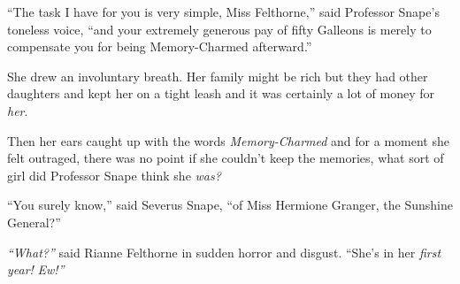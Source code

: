``The task I have for you is very simple, Miss Felthorne,'' said
Professor Snape's toneless voice, ``and your extremely generous pay of
fifty Galleons is merely to compensate you for being Memory-Charmed
afterward.''

She drew an involuntary breath. Her family might be rich but they had
other daughters and kept her on a tight leash and it was certainly a lot
of money for \emph{her}.

Then her ears caught up with the words \emph{Memory-Charmed} and for a
moment she felt outraged, there was no point if she couldn't keep the
memories, what sort of girl did Professor Snape think she \emph{was?}

``You surely know,'' said Severus Snape, ``of Miss Hermione Granger, the
Sunshine General?''

\emph{``What?''} said Rianne Felthorne in sudden horror and disgust.
``She's in her \emph{first year!} \emph{Ew!''}
